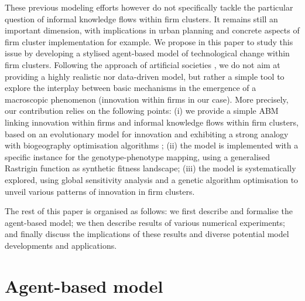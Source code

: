 \documentclass[letterpaper]{article}
\begin{document}
These previous modeling efforts however do not specifically tackle the particular question of informal knowledge flows within firm clusters. It remains still an important dimension, with implications in urban planning and concrete aspects of firm cluster implementation for example. We propose in this paper to study this issue by developing a stylised agent-based model of technological change within firm clusters. Following the approach of artificial societies \citep{epstein1997artificial}, we do not aim at providing a highly realistic nor data-driven model, but rather a simple tool to explore the interplay between basic mechanisms in the emergence of a macroscopic phenomenon (innovation within firms in our case). More precisely, our contribution relies on the following points: (i) we provide a simple ABM linking innovation within firms and informal knowledge flows within firm clusters, based on an evolutionary model for innovation and exhibiting a strong analogy with biogeography optimisation algorithms \citep{simon2008biogeography}; (ii) the model is implemented with a specific instance for the genotype-phenotype mapping, using a generalised Rastrigin function as synthetic fitness landscape; (iii) the model is systematically explored, using global sensitivity analysis and a genetic algorithm optimisation to unveil various patterns of innovation in firm clusters.

The rest of this paper is organised as follows: we first describe and formalise the agent-based model; we then describe results of various numerical experiments; and finally discuss the implications of these results and diverse potential model developments and applications.


\section{Agent-based model}


\end{document}
